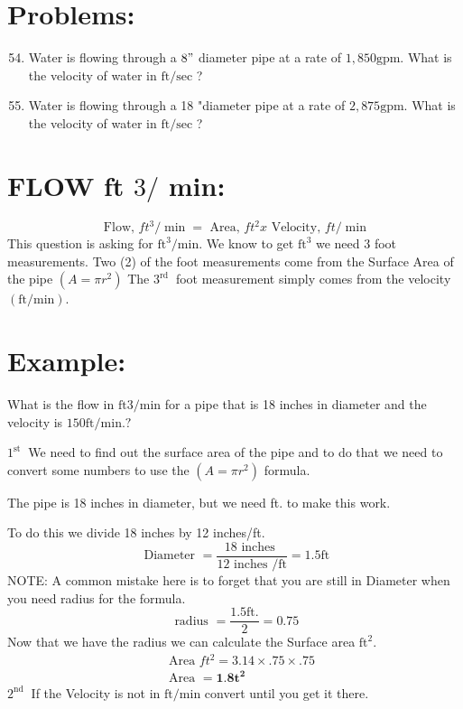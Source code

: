 \documentclass[10pt]{article}
\begin{document}
\section{Problems:}
\begin{enumerate}
  \setcounter{enumi}{53}
  \item Water is flowing through a $8 "$ diameter pipe at a rate of $1,850 \mathrm{gpm}$. What is the velocity of water in $\mathrm{ft} / \mathrm{sec}$ ?

  \item Water is flowing through a 18 "diameter pipe at a rate of $2,875 \mathrm{gpm}$. What is the velocity of water in $\mathrm{ft} / \mathrm{sec}$ ?

\end{enumerate}
\section{FLOW ft $3 /$ min:}
$$
\text { Flow, } f t^{3} / \min =\text { Area, } f t^{2} x \text { Velocity, } f t / \min
$$
This question is asking for $\mathrm{ft}^{3} / \mathrm{min}$. We know to get $\mathrm{ft}^{3}$ we need 3 foot measurements. Two (2) of the foot measurements come from the Surface Area of the pipe $\left(A=\pi r^{2}\right)$ The $3^{\text {rd }}$ foot measurement simply comes from the velocity $(\mathrm{ft} / \mathrm{min})$.

\section{Example:}
What is the flow in $\mathrm{ft} 3 / \mathrm{min}$ for a pipe that is 18 inches in diameter and the velocity is $150 \mathrm{ft} / \mathrm{min} . ?$

$1^{\text {st }}$ We need to find out the surface area of the pipe and to do that we need to convert some numbers to use the $\left(A=\pi r^{2}\right)$ formula.

The pipe is 18 inches in diameter, but we need ft. to make this work.

To do this we divide 18 inches by 12 inches/ft.
$$
\text { Diameter }=\frac{18 \text { inches }}{12 \text { inches } / \mathrm{ft}}=1.5 \mathrm{ft}
$$
NOTE: A common mistake here is to forget that you are still in Diameter when you need radius for the formula.
$$
\text { radius }=\frac{1.5 \mathrm{ft} .}{2}=0.75
$$
Now that we have the radius we can calculate the Surface area $\mathrm{ft}^{2}$.
$$
\begin{aligned}
&\text { Area } f t^{2}=3.14 \times .75 \times .75 \\
&\text { Area }=\mathbf{1 . 8 t ^ { 2 }}
\end{aligned}
$$
$2^{\text {nd }}$ If the Velocity is not in $\mathrm{ft} / \mathrm{min}$ convert until you get it there.
\end{document}
